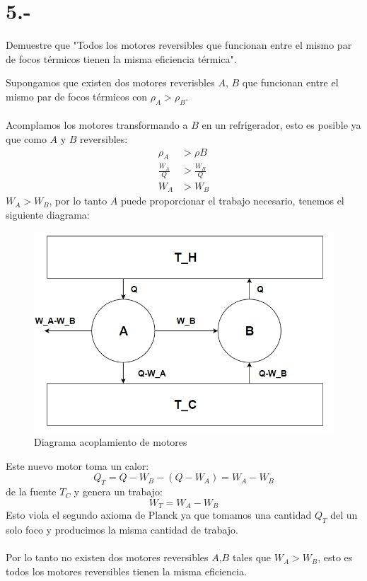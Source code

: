 \documentclass{article}
\begin{document}
\section*{5.-}
Demuestre que "Todos los motores reversibles que funcionan entre el mismo 
par de focos térmicos tienen la misma eficiencia térmica".
\begin{tcolorbox}[breakable]
    Supongamos que existen dos motores reverisbles $A$, $B$ que funcionan entre el mismo 
    par de focos térmicos con $\rho_A > \rho_B$. \\ \\
    Acomplamos los motores transformando a $B$ en un refrigerador, esto es posible 
    ya que como $A$ y $B$ reversibles:
    \begin{align*}
        \rho_A &> \rho B \\
        \frac{W_A}{Q} &> \frac{W_B}{Q} \\
        W_A &> W_B
    \end{align*}
    $W_A > W_B$, por lo tanto $A$ puede proporcionar el trabajo necesario,
    tenemos el siguiente diagrama:  
    \begin{figure}[H]
        \centering
        \includegraphics[scale=0.5]{images/p5_diagram.png}
        \caption{Diagrama acoplamiento de motores}
        \label{}
    \end{figure}
    Este nuevo motor toma un calor:
    \[ Q_T = Q-W_B-(Q-W_A) = W_A - W_B \]
    de la fuente $T_C$ y genera un trabajo: 
    \[ W_T = W_A-W_B \]
    Esto viola el segundo axioma de Planck ya que tomamos una cantidad $Q_T$ del un solo foco
    y producimos la misma cantidad de trabajo. \\ \\
    Por lo tanto no existen dos motores reversibles $A$,$B$ tales que $W_A > W_B$, esto es 
    todos los motores reversibles tienen la misma eficiencia.
\end{tcolorbox}
\end{document}
